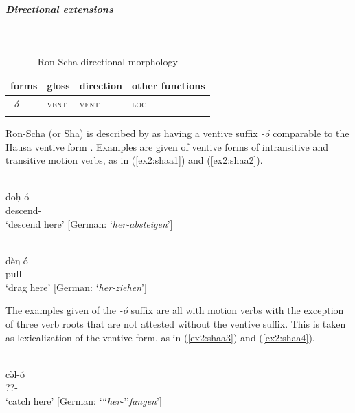 \subparagraph{Directional extensions}~



\begin{table}[H]
	\caption{Ron-Scha directional morphology}
	\label{tab:shaa}
	\begin{tabular}{llll} %
		\lsptoprule
		forms & gloss & direction  & other functions \\ %
		\midrule
		\textit{-ó}  & \textsc{vent} &  \textsc{vent} &  \textsc{loc}  \\
		\lspbottomrule
	\end{tabular}
\end{table} 

Ron-Scha (or Sha) is described by \citet[268–269]{jungraithmayrRonSprachenTaschadohamitischeStudien1970} as having a ventive suffix \textit{-ó} comparable to the Hausa ventive form \citep[cf.][308]{schuhChadicCornucopia2017}. Examples are given of ventive forms of intransitive and transitive motion verbs, as in (\ref{ex2:shaa1}) and (\ref{ex2:shaa2}). 

\ea\label{ex2:shaa1}
 \\
\gll doḥ-ó	\\ 
descend- \\
\glt `descend here' [German: `\textit{her-absteigen}']

\ex\label{ex2:shaa2}
 \\
\gll də̀ŋ-ó \\
pull- \\
\glt `drag here' [German: `\textit{her-ziehen}']
\z 

The examples given of the \textit{-ó} suffix are all with motion verbs with the exception of three verb roots that are not attested without the ventive suffix. This is taken as lexicalization of the ventive form, as in (\ref{ex2:shaa3}) and (\ref{ex2:shaa4}). 

\ea\label{ex2:shaa3}
 \\
\gll cə̀l-ó \\
??- \\
\glt `catch here' [German: `{``}\textit{her}-''\textit{fangen}']


